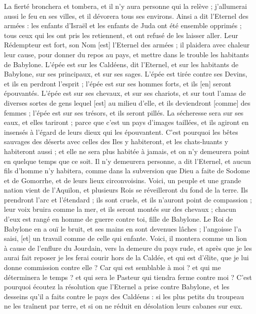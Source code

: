 \begin{multicols}{2}
La fierté bronchera et tombera, et il n'y aura personne qui la relève ; j'allumerai aussi le feu en ses villes, et il dévorera tous ses environs.
Ainsi a dit l'Eternel des armées : les enfants d'Israël et les enfants de Juda ont été ensemble opprimés ; tous ceux qui les ont pris les retiennent, et ont refusé de les laisser aller.
Leur Rédempteur est fort, son Nom [est] l'Eternel des armées ; il plaidera avec chaleur leur cause, pour donner du repos au pays, et mettre dans le trouble les habitants de Babylone.
L'épée est sur les Caldéens, dit l'Eternel, et sur les habitants de Babylone, sur ses principaux, et sur ses sages.
L'épée est tirée contre ses Devins, et ils en perdront l'esprit ; l'épée est sur ses hommes forts, et ils [en] seront épouvantés.
L'épée est sur ses chevaux, et sur ses chariots, et sur tout l'amas de diverses sortes de gens lequel [est] au milieu d'elle, et ils deviendront [comme] des femmes ; l'épée est sur ses trésors, et ils seront pillés.
La sécheresse sera sur ses eaux, et elles tariront ; parce que c'est un pays d'images taillées, et ils agiront en insensés à l'égard de leurs dieux qui les épouvantent.
C'est pourquoi les bêtes sauvages des déserts avec celles des Iles y habiteront, et les chats-huants y habiteront aussi ; et elle ne sera plus habitée à jamais, et on n'y demeurera point en quelque temps que ce soit.
Il n'y demeurera personne, a dit l'Eternel, et aucun fils d'homme n'y habitera, comme dans la subversion que Dieu a faite de Sodome et de Gomorrhe, et de leurs lieux circonvoisins.
Voici, un peuple et une grande nation vient de l'Aquilon, et plusieurs Rois se réveilleront du fond de la terre.
Ils prendront l'arc et l'étendard ; ils sont cruels, et ils n'auront point de compassion ; leur voix bruira comme la mer, et ils seront montés sur des chevaux ; chacun d'eux est rangé en homme de guerre contre toi, fille de Babylone.
Le Roi de Babylone en a ouï le bruit, et ses mains en sont devenues lâches ; l'angoisse l'a saisi, [et] un travail comme de celle qui enfante.
Voici, il montera comme un lion à cause de l'enflure du Jourdain, vers la demeure du pays rude, et après que je les aurai fait reposer je les ferai courir hors de la Caldée, et qui est d'élite, que je lui donne commission contre elle ? Car qui est semblable à moi ? et qui me déterminera le temps ? et qui sera le Pasteur qui tiendra ferme contre moi ?
C'est pourquoi écoutez la résolution que l'Eternel a prise contre Babylone, et les desseins qu'il a faits contre le pays des Caldéens : si les plus petits du troupeau ne les traînent par terre, et si on ne réduit en désolation leurs cabanes sur eux.

\end{multicols}
